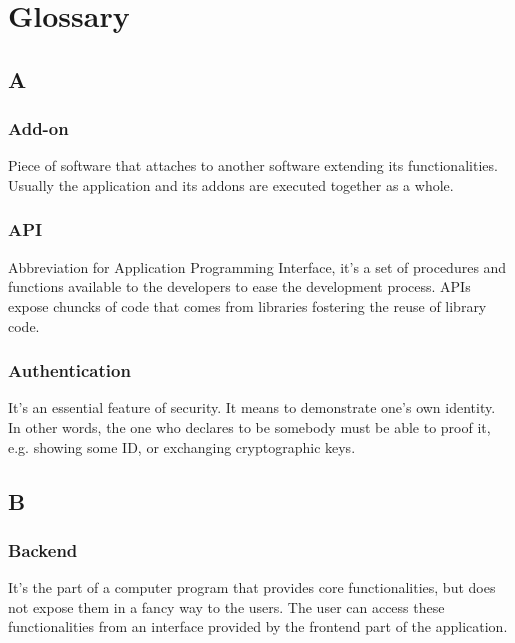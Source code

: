 \section{Glossary}

\subsection*{A}

\subsubsection*{Add-on}
Piece of software that attaches to another software extending its functionalities. Usually the application and its addons are executed together as a whole.

\subsubsection*{API}
Abbreviation for Application Programming Interface, it's a set of procedures and functions available to the developers to ease the development process. APIs expose chuncks of code that comes from libraries fostering the reuse of library code.

\subsubsection*{Authentication}
It's an essential feature of security. It means to demonstrate one's own identity. In other words, the one who declares to be somebody must be able to proof it, e.g. showing some ID, or exchanging cryptographic keys.

\subsection*{B}

\subsubsection*{Backend}
It's the part of a computer program that provides core functionalities, but does not expose them in a fancy way to the users.
The user can access these functionalities from an interface provided by the frontend part of the application.


